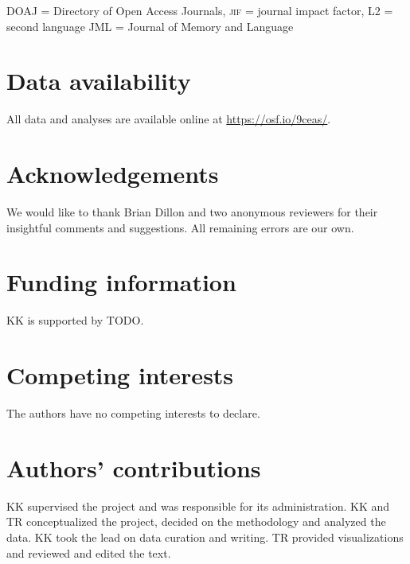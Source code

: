 \documentclass[cm,linguex]{glossa}
\begin{document}
\textsc{DOAJ} = Directory of Open Access Journals,
\textsc{jif} = journal impact factor,
\textsc{L2} = second language
\textsc{JML} = Journal of Memory and Language

\hypertarget{data-availabilitysupplementary-files-optional}{%
\section*{Data availability}\label{data-availabilitysupplementary-files-optional}}

All data and analyses are available online at \url{https://osf.io/9ceas/}.

\hypertarget{acknowledgements-optional}{%
\section*{Acknowledgements}\label{acknowledgements-optional}}

We would like to thank Brian Dillon and two anonymous reviewers for their insightful comments and suggestions. All remaining errors are our own.

\hypertarget{funding-information-optional}{%
\section*{Funding information}\label{funding-information-optional}}

KK is supported by TODO.

\hypertarget{competing-interests-mandatory}{%
\section*{Competing interests}\label{competing-interests-mandatory}}

The authors have no competing interests to declare.

\hypertarget{contrib}{%
\section*{Authors' contributions}\label{contrib}}

KK supervised the project and was responsible for its administration. KK and TR conceptualized the project, decided on the methodology and analyzed the data. KK took the lead on data curation and writing. TR provided visualizations and reviewed and edited the text.


\end{document}
